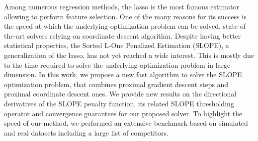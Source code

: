 Among numerous regression methods, the lasso is the most famous estimator allowing to perform feature selection. %
One of the many reasons for its success is the speed at which the underlying optimization problem can be solved, state-of-the-art solvers relying on coordinate descent algorithm.
Despite having better statistical properties, the Sorted L-One Penalized Estimation (SLOPE), a generalization of the lasso, has not yet reached a wide interest.
This is mostly due to the time required to solve the underlying optimization problem in large dimension.
In this work, we propose a new fast algorithm to solve the SLOPE optimization problem,
that combines proximal gradient descent steps and proximal coordinate descent ones.
We provide new results on the directional derivatives of the SLOPE penalty function, its related SLOPE thresholding operator and convergence guarantees for our proposed solver.
To highlight the speed of our method, we performed an extensive benchmark based on simulated and real datasets including a large list of competitors.
